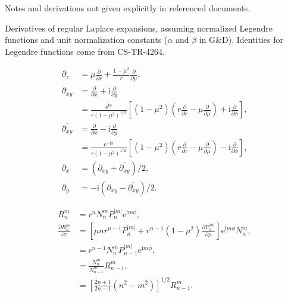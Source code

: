 \documentclass[a4paper,12pt]{article}
\newcommand{\E}{\mathrm{e}}
\newcommand{\J}{\mathrm{i}}
\begin{document}
Notes and derivations not given explicitly in referenced documents.

Derivatives of regular Laplace expansions, assuming normalized
Legendre functions and unit normalization constants ($\alpha$ and
$\beta$ in G\&D). Identities for Legendre functions come from
CS-TR-4264. 

\begin{align}
  \partial_{z} &= \mu\frac{\partial}{\partial r}
                 + \frac{1-\mu^{2}}{r}\frac{\partial}{\partial \mu},\\
  \partial_{xy} &= \frac{\partial}{\partial x} + \J
                  \frac{\partial}{\partial y}\\
               &=
                 \frac{\E^{\J\phi}}{r(1-\mu^{2})^{1/2}}
                 \left[
                 (1-\mu^{2})
                 \left(
                 r\frac{\partial}{\partial r}
                 -\mu\frac{\partial}{\partial \mu}
                 \right)
                 + \J\frac{\partial}{\partial \phi}
                 \right],\\
  \overline{\partial_{xy}}
               &= \frac{\partial}{\partial x} - \J
                  \frac{\partial}{\partial y}\\
               &=
                 \frac{\E^{-\J\phi}}{r(1-\mu^{2})^{1/2}}
                 \left[
                 (1-\mu^{2})
                 \left(
                 r\frac{\partial}{\partial r}
                 -\mu\frac{\partial}{\partial \mu}
                 \right)
                 - \J\frac{\partial}{\partial \phi}
                 \right],\\
  \partial_{x} &= (\partial_{xy}+\overline{\partial_{xy}})/2,\\
  \partial_{y} &= -\J(\partial_{xy}-\overline{\partial_{xy}})/2.
\end{align}

\begin{align}
  R_{n}^{m} &= r^{n} N_{n}^{m}P_{n}^{|m|}\E^{\J m \phi},\\
  \frac{\partial R_{n}^{m}}{\partial z}
            &=
              \left[
              \mu n r^{n-1}P_{n}^{|m|} + r^{n-1}(1-\mu^{2})
              \frac{\partial P_{n}^{|m|}}{\partial \mu}
              \right]\E^{\J m \phi} N_{n}^{m},\\
            &= r^{n-1}N_{n}^{m}P_{n-1}^{|m|}\E^{\J m \phi},\\
            &= \frac{N_{n}^{m}}{N_{n-1}^{m}}R_{n-1}^{m},\\
            &=
              \left[
              \frac{2n+1}{2n-1}
              (n^{2}-m^{2})
              \right]^{1/2}R_{n-1}^{m}.
\end{align}
\end{document}

